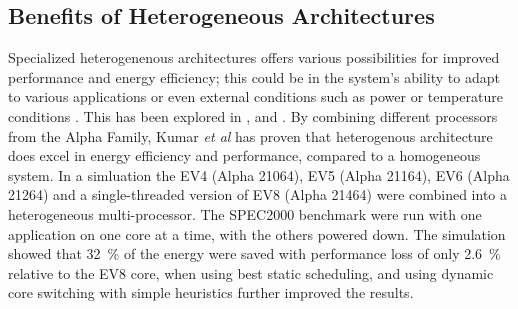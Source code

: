\subsection{Benefits of Heterogeneous Architectures}
\label{sec:heterogeneous}

Specialized heterogenenous architectures offers various possibilities for improved performance and energy efficiency;
this could be in the system's ability to adapt to various applications or even external conditions such as
power or temperature conditions \cite{heterogeneous-ee, heterogeneous-perf, heterogeneous-arch}.
This has been explored in \cite{heterogeneous-ee}, \cite{heterogeneous-perf} and \cite{heterogeneous-arch}.
By combining different processors from the Alpha Family, Kumar \textit{et al} has proven that heterogenous architecture does excel in energy efficiency and performance, compared to a homogeneous system.
In a simluation the EV4 (Alpha 21064), EV5 (Alpha 21164), EV6 (Alpha 21264) and a single-threaded version of EV8 (Alpha 21464) were combined into a heterogeneous multi-processor.
The SPEC2000 benchmark were run with one application on one core at a time, with the others powered down.
The simulation showed that 32~\% of the energy were saved with performance loss of only 2.6~\% relative to the EV8 core, when using best static scheduling, and using dynamic core switching with simple heuristics further improved the results. \cite{heterogeneous-ee}

